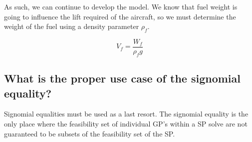 As such, we can continue to develop the model. We know that fuel weight is going 
to influence the lift required of the aircraft, so we must determine the weight of the fuel 
using a density parameter $\rho_{f}$. 

\begin{equation}
    V_f = \frac{W_f } {\rho_f g}
    \label{e:vf}
\end{equation}


\subsection{What is the proper use case of the signomial equality?} 

Signomial equalities must be used as a last resort. The signomial equality is the only place where the feasibility set of individual \gls{GP}'s within a \gls{SP} solve are not guaranteed to be subsets of the feasibility set of the \gls{SP}. 